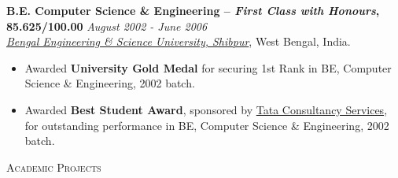 \documentclass[9pt]{article}
\newenvironment{changemargin}[2]{%
  \begin{list}{}{%
    \setlength{\topsep}{0pt}%
    \setlength{\leftmargin}{#1}%
    \setlength{\rightmargin}{#2}%
    \setlength{\listparindent}{\parindent}%
    \setlength{\itemindent}{\parindent}%
    \setlength{\parsep}{\parskip}%
  }%
  \item[]}{\end{list}
}
\newcommand{\lineover}{
	\begin{changemargin}{-0.05in}{-0.05in}
		\vspace*{-8pt}
		\hrulefill \\
		\vspace*{-2pt}
	\end{changemargin}
}
\newcommand{\header}[1]{
	\begin{changemargin}{-0.5in}{-0.5in}
		\scshape{#1}\\
  	\lineover
	\end{changemargin}
}
\newenvironment{body} {
	\vspace*{-16pt}
	\begin{changemargin}{-0.25in}{-0.5in}
  }	
	{\end{changemargin}
}
\begin{document}
\begin{body}
  \medskip
	\textbf{B.E. Computer Science \& Engineering -- \emph{First Class with Honours}, 85.625/100.00} \hfill \emph{August 2002 - June 2006} \\
	\emph{\href{http://www.becs.ac.in/}{Bengal Engineering \& Science University, Shibpur}}, West Bengal, India.\\
	\begin{itemize} \itemsep -0pt
		\item Awarded \textbf{University Gold Medal} for securing 1st Rank in BE, Computer Science \& Engineering, 2002 batch.
		\item Awarded \textbf{Best Student Award}, sponsored by \href{http://www.tcs.com}{Tata Consultancy Services}, for outstanding performance in BE, Computer Science \& Engineering, 2002 batch.
	\end{itemize}
\end{body}

\smallskip

\newpage
\header{Academic Projects}
\end{document}
